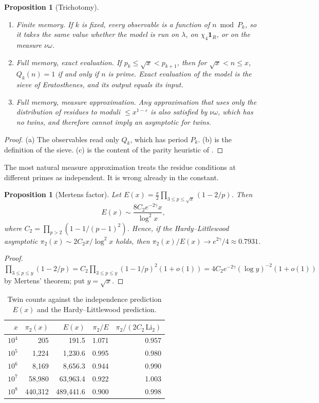 \documentclass[11pt]{amsart}
\newtheorem{proposition}[theorem]{Proposition}
\theoremstyle{definition}
\theoremstyle{remark}
\newcommand{\one}{\mathbf 1}
\begin{document}
\begin{proposition}[Trichotomy]\label{prop:trichotomy}
\begin{enumerate}
\item[(a)] \emph{Finite memory.} If $k$ is fixed, every observable is a function of $n\bmod P_k$, so it takes the same value whether the model is run on $\lambda$, on $\chi_4\one_R$, or on the measure $\nu\omega$.
\item[(b)] \emph{Full memory, exact evaluation.} If $p_k\le\sqrt x<p_{k+1}$, then for $\sqrt x<n\le x$, $Q_k(n)=1$ if and only if $n$ is prime. Exact evaluation of the model is the sieve of Eratosthenes, and its output equals its input.
\item[(c)] \emph{Full memory, measure approximation.} Any approximation that uses only the distribution of residues to moduli $\le x^{1-\varepsilon}$ is also satisfied by $\nu\omega$, which has no twins, and therefore cannot imply an asymptotic for twins.
\end{enumerate}
\end{proposition}

\begin{proof}
(a) The observables read only $Q_k$, which has period $P_k$. (b) is the definition of the sieve. (c) is the content of the parity heuristic of \cite[\S8]{Polymath8b}.
\end{proof}

The most natural measure approximation treats the residue conditions at different primes as independent. It is wrong already in the constant.

\begin{proposition}[Mertens factor]\label{prop:mertens}
Let $E(x)=\frac x2\prod_{3\le p\le\sqrt x}(1-2/p)$. Then
\[E(x)\sim \frac{8C_2e^{-2\gamma}x}{\log^2x},\]
where $C_2=\prod_{p>2}(1-1/(p-1)^2)$. Hence, if the Hardy--Littlewood asymptotic $\pi_2(x)\sim2C_2x/\log^2x$ \cite{HL23} holds, then $\pi_2(x)/E(x)\to e^{2\gamma}/4\approx0.7931$.
\end{proposition}

\begin{proof}
$\prod_{3\le p\le y}(1-2/p)=C_2\prod_{3\le p\le y}(1-1/p)^2(1+o(1))=4C_2e^{-2\gamma}(\log y)^{-2}(1+o(1))$ by Mertens' theorem; put $y=\sqrt x$.
\end{proof}

\begin{table}[h]
\centering\small
\caption{Twin counts against the independence prediction $E(x)$ and the Hardy--Littlewood prediction.}\label{tab:mertens}
\begin{tabular}{rrrrr}
\toprule
$x$ & $\pi_2(x)$ & $E(x)$ & $\pi_2/E$ & $\pi_2/(2C_2\,\mathrm{Li}_2)$\\
\midrule
$10^4$ & 205 & 191.5 & 1.071 & 0.957\\
$10^5$ & 1{,}224 & 1{,}230.6 & 0.995 & 0.980\\
$10^6$ & 8{,}169 & 8{,}656.3 & 0.944 & 0.990\\
$10^7$ & 58{,}980 & 63{,}963.4 & 0.922 & 1.003\\
$10^8$ & 440{,}312 & 489{,}441.6 & 0.900 & 0.998\\
\bottomrule
\end{tabular}
\end{table}
\end{document}
